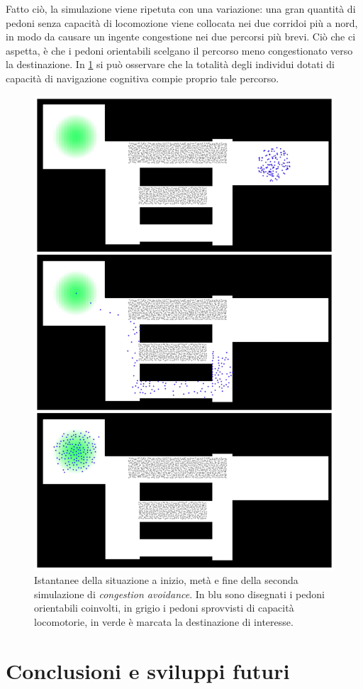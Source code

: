 \documentclass[12pt,a4paper,openright,oneside]{book}
\begin{document}
Fatto ciò, la simulazione viene ripetuta con una variazione: una gran quantità di pedoni senza capacità di locomozione viene collocata nei due corridoi più a nord, in modo da causare un ingente congestione nei due percorsi più brevi. Ciò che ci aspetta, è che i pedoni orientabili scelgano il percorso meno congestionato verso la destinazione. In \cref{fig:congestion-avoidance-2} si può osservare che la totalità degli individui dotati di capacità di navigazione cognitiva compie proprio tale percorso.
\begin{figure}
	\centering
	\includegraphics[width=0.7\linewidth]{figures/congestion-avoidance-2.png}
	\caption{Istantanee della situazione a inizio, metà e fine della seconda simulazione di \emph{congestion avoidance}. In blu sono disegnati i pedoni orientabili coinvolti, in grigio i pedoni sprovvisti di capacità locomotorie, in verde è marcata la destinazione di interesse.}
	\label{fig:congestion-avoidance-2}
\end{figure}

\chapter{Conclusioni e sviluppi futuri}
\label{chap:conclusions}
\end{document}
